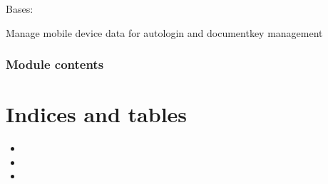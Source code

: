 \documentclass[letterpaper,10pt,english]{sphinxmanual}
\begin{document}
\begin{savenotes}\begin{fulllineitems}
\label{\detokenize{eezz:eezz.mobile.TMobileDevices}}
\pysigstartsignatures
{}
\pysigstopsignatures
\sphinxAtStartPar
Bases: 

\sphinxAtStartPar
Manage mobile device data for auto\sphinxhyphen{}login and document\sphinxhyphen{}key management

\end{fulllineitems}\end{savenotes}



\subsection{Module contents}
\label{\detokenize{eezz:module-eezz}}\label{\detokenize{eezz:module-contents}}

\chapter{Indices and tables}
\label{\detokenize{index:indices-and-tables}}\begin{itemize}
\item {} 
\sphinxAtStartPar
{}

\item {} 
\sphinxAtStartPar
{}

\item {} 
\sphinxAtStartPar
{}

\end{itemize}
\end{document}

